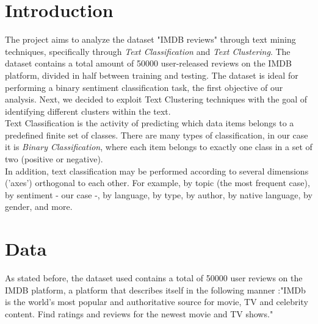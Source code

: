 \documentclass[fleqn,10pt]{SelfArx} %
\affiliation{\textbf{University}: University of Milan-Bicocca} %
\begin{document}
\maketitle %

\tableofcontents %

\thispagestyle{empty} %


\section{Introduction}
The project aims to analyze the dataset "IMDB reviews" \cite{} through text mining techniques, specifically through \textit{Text Classification} and \textit{Text Clustering}. The dataset contains a total amount of 50000 user-released reviews on the IMDB platform, divided in half between training and testing. The dataset is ideal for performing a binary sentiment classification task, the first objective of our analysis. Next, we decided to exploit Text Clustering techniques with the goal of identifying different clusters within the text.\\
Text Classification is the activity of predicting which data items belongs to a predefined finite set of classes. There are many types of classification, in our case it is \textit{Binary Classification}, where each item belongs to exactly one class in a set of two (positive or negative).\\
In addition, text classification may be performed according to several dimensions ('axes') orthogonal to each other. For example, by topic (the most frequent case), by sentiment - our case -, by language, by type, by author, by native language, by gender, and more.\\

\section{Data}
As stated before, the dataset used contains a total of 50000 user reviews on the IMDB platform, a platform that describes itself in the following manner :"IMDb is the world's most popular and authoritative source for movie, TV and celebrity content. Find ratings and reviews for the newest movie and TV shows."
\end{document}
